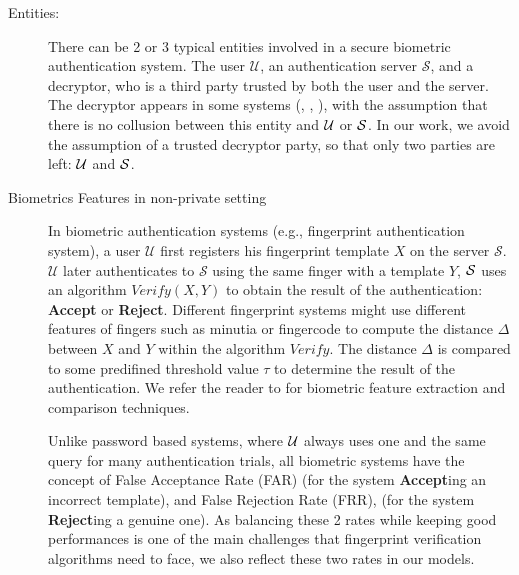 \begin{description}
\item[Entities:] There can be 2 or 3 typical entities involved in a secure
  biometric authentication system. The user $\mathcal{U}$, an authentication
  server $\mathcal{S}$, and a decryptor, who is a third party trusted by both
  the user and the server. The decryptor appears in some systems
  (\cite{mandal2015comprehensive}, \cite{hirano2013cryptographically},
  \cite{higo2015privacy}), with the assumption that there is no collusion
  between this entity and $\mathcal{U}$ or $\mathcal{S}$. In our work, we avoid the
  assumption of a trusted decryptor party, so that only two parties are left:
  $\mathcal{U}$ and $\mathcal{S}$.
\item[Biometrics Features in non-private setting] In biometric authentication
  systems (e.g., fingerprint authentication system), a user $\mathcal{U}$ first
  registers his fingerprint template $X$ on the server
  $\mathcal{S}$. $\mathcal{U}$ later authenticates to $\mathcal{S}$ using
  the same finger with a template $Y$, $\mathcal{S}$ uses an algorithm $Verify(X,Y)$
  to obtain the result of the authentication: \textbf{Accept} or
  \textbf{Reject}. Different fingerprint systems might use different features of
  fingers such as minutia or fingercode \cite{ferrara2012noninvertible ,jain1999fingercode} to compute the distance $\Delta$ between
  $X$ and $Y$ within the algorithm $Verify$. The distance $\Delta$ is compared
  to some predifined threshold value $\tau$ to determine the result of the
  authentication. We refer the reader to \cite{jain2007handbook} for biometric
  feature extraction and
  comparison techniques.

  Unlike password based systems, where $\mathcal{U}$ always uses one and the same
  query for many authentication trials, all biometric systems have the concept
  of False Acceptance Rate (FAR) (for the system \textbf{Accept}ing an incorrect
  template), and False Rejection Rate (FRR), (for the system \textbf{Reject}ing
  a genuine one).  As balancing these 2 rates while keeping good performances is
  one of the main challenges that fingerprint verification algorithms
  \cite{FVConGoi2:online} need to face, we also reflect these two rates in our
  models.


\end{description}
